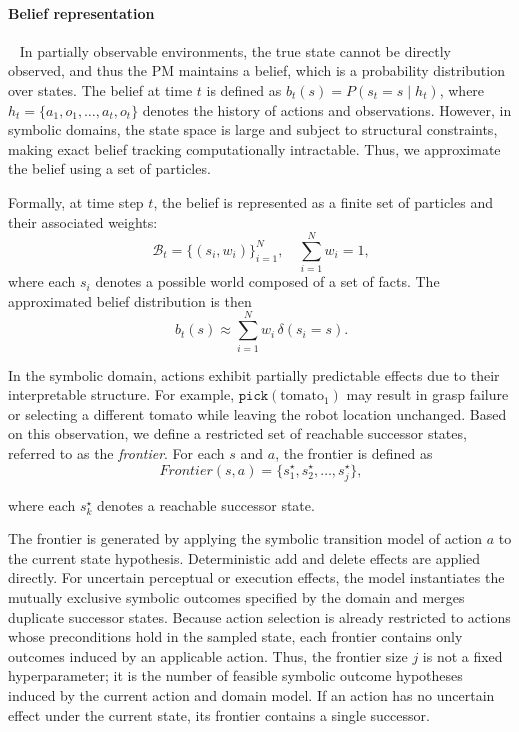 \paragraph{Belief representation}~\label{method:belief_rep}
In partially observable environments, the true state cannot be directly observed, and thus the PM maintains a belief, which is a probability distribution over states. The belief at time $t$ is defined as $b_t(s) = P(s_t = s \mid h_t)$, where $h_t = \{a_1, o_1, \dots, a_t, o_t \}$ denotes the history of actions and observations. However, in symbolic domains, the state space is large and subject to structural constraints, making exact belief tracking computationally intractable. Thus, we approximate the belief using a set of particles.

Formally, at time step $t$, the belief is represented as a finite set of particles and their associated weights:
\begin{equation}~\label{eq:particles}
\mathcal{B}_t = \{ (s_i, w_i) \}_{i=1}^{N}, \quad \sum_{i=1}^{N} w_i = 1,
\end{equation}
where each $s_i$ denotes a possible world composed of a set of facts. The approximated belief distribution is then
\begin{equation}~\label{eq:particles_approx}
b_t(s) \approx \sum_{i=1}^{N} w_i \, \delta(s_i = s).
\end{equation}

In the symbolic domain, actions exhibit partially predictable effects due to their interpretable structure. For example, $\texttt{pick}(\text{tomato}_1)$ may result in grasp failure or selecting a different tomato while leaving the robot location unchanged. Based on this observation, we define a restricted set of reachable successor states, referred to as the \textit{frontier}. For each $s$ and $a$, the frontier is defined as
\begin{equation}~\label{eq:frontier}
Frontier(s,a) = \{ s_1^{\star}, s_2^{\star}, \dots, s_j^{\star} \},
\end{equation}

where each $s_k^{\star}$ denotes a reachable successor state.

The frontier is generated by applying the symbolic transition model of action $a$ to the current state hypothesis. Deterministic add and delete effects are applied directly. For uncertain perceptual or execution effects, the model instantiates the mutually exclusive symbolic outcomes specified by the domain and merges duplicate successor states. Because action selection is already restricted to actions whose preconditions hold in the sampled state, each frontier contains only outcomes induced by an applicable action. Thus, the frontier size $j$ is not a fixed hyperparameter; it is the number of feasible symbolic outcome hypotheses induced by the current action and domain model. If an action has no uncertain effect under the current state, its frontier contains a single successor.

